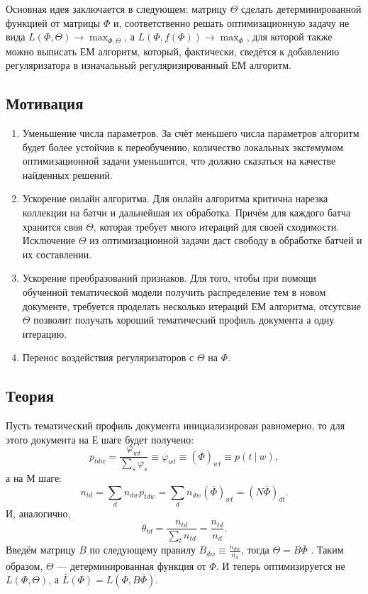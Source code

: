 \documentclass[12pt]{article}
\renewcommand{\phi}{\varphi}
\begin{document}
Основная идея заключается в следующем: матрицу $\Theta$ сделать детерминированной функцией от матрицы $\Phi$ и, соответственно решать оптимизационную задачу не вида $L(\Phi, \Theta) \to \max_{\Phi, \Theta}$,  а $L(\Phi, f(\Phi) )\to \max_{\Phi}$, для которой также можно выписать ЕМ алгоритм, который, фактически, сведётся к добавлению регуляризатора в изначальный регуляризированный ЕМ алгоритм.

\subsection{Мотивация}
\begin{enumerate}
\item Уменьшение  числа параметров. За счёт меньшего числа параметров алгоритм будет более устойчив к переобучению, количество локальных экстемумом оптимизационной задачи уменьшится, что должно сказаться на качестве найденных решений.
\item Ускорение онлайн алгоритма. Для онлайн алгоритма критична нарезка коллекции на батчи и дальнейшая их обработка. Причём для каждого батча хранится своя $\Theta$, которая требует много итераций для своей сходимости. Исключение $\Theta$ из оптимизационной задачи даст свободу в обработке батчей и их составлении.
\item Ускорение преобразований признаков. Для того, чтобы при помощи обученной  тематической модели получить распределение тем в  новом документе, требуется проделать несколько итераций ЕМ алгоритма, отсутсвие $\Theta$ позволит получать хороший тематический профиль документа а одну итерацию.
\item Перенос воздействия регуляризаторов с $\Theta$ на $\Phi$.
\end{enumerate}


\subsection{Теория}

Пусть тематический профиль документа инициализирован равномерно, то для этого документа на Е шаге будет получено: 
\[
p_{tdw} = \frac{\phi_{wt}}{\sum_s \phi_s} \equiv \overline{\phi}_{wt} \equiv (\overline{\Phi})_{wt} \equiv p(t~|~w),
\]
а на М шаге: 
\[
n_{td} = \sum_{d} n_{dw} p_{tdw} = \sum_{d} n_{dw} (\overline{\Phi})_{wt} = (N\overline{\Phi})_{dt}.
\]
И, аналогично, 
\[
\theta_{td} = \frac{n_{td}}{\sum_t n_{td}} =  \frac{n_{td}}{n_d}.
\]
Введём матрицу $B$ по следующему правилу $B_{dw} \equiv \frac{n_{dw}}{n_d}$, тогда $\Theta = B \overline{\Phi}$ . Таким образом, $\Theta$ --- детерминированная функция от $\Phi$. И теперь оптимизируется не $L(\Phi, \Theta)$, а $\overline{L}(\Phi) = L(\Phi, B \overline{\Phi})$.
\end{document}

